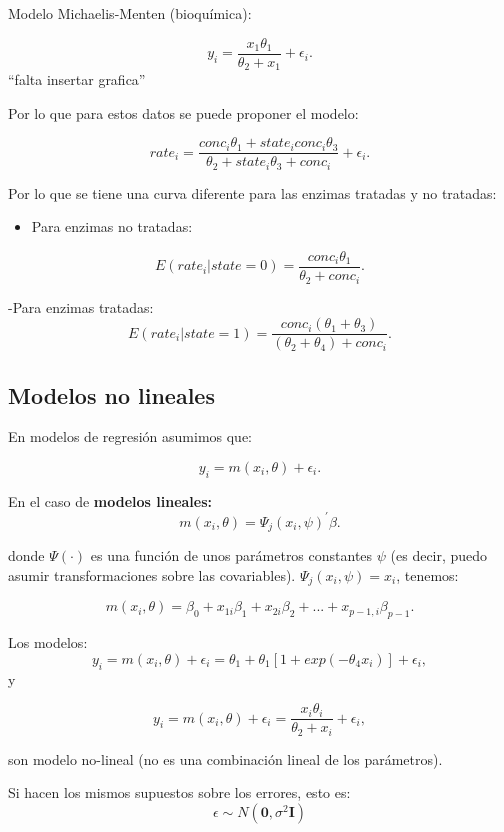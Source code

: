 \documentclass[
]{article}
\providecommand{\tightlist}{%
  \setlength{\itemsep}{0pt}\setlength{\parskip}{0pt}}
\begin{document}
Modelo Michaelis-Menten (bioquímica):

\[
y_{i}=\frac{x_{1}\theta_{1}}{\theta_{2}+x_{1}}+\epsilon_{i}.
\]
``falta insertar grafica''

Por lo que para estos datos se puede proponer el modelo:

\[
rate_{i}=\frac{conc_{i}\theta_{1}+state_{i}conc_{i}\theta_{3}}
{\theta_{2}+state_{i}\theta_{3}+conc_{i}}+\epsilon_{i}.
\]

Por lo que se tiene una curva diferente para las enzimas tratadas y
no tratadas:

\begin{itemize}
\tightlist
\item
  Para enzimas no tratadas:
\end{itemize}

\[
E(rate_{i}|state=0)=\frac{conc_{i}\theta_{1}}{\theta_{2}+conc_{i}}.
\]

-Para enzimas tratadas:
\[
E(rate_{i}|state=1)=\frac{conc_{i}(\theta_{1}+\theta_{3})}{(\theta_{2}+\theta_{4})+conc_{i}}.
\]

\hypertarget{modelos-no-lineales-1}{%
\subsection{Modelos no lineales}\label{modelos-no-lineales-1}}

En modelos de regresión asumimos que:

\[
y_{i}=m(x_{i},\theta)+\epsilon_{i}.
\]

En el caso de \textbf{modelos lineales:}
\[
m(x_{i},\theta)=\Psi_{j}(x_{i},\psi)^{'}\beta.
\]

donde \(\Psi(\cdot)\) es una función de unos parámetros constantes \(\psi\)
(es decir, puedo asumir transformaciones sobre las covariables).
\(\Psi_{j}(x_{i},\psi)=x_{i}\), tenemos:

\[
m(x_{i},\theta)=\beta_{0}+x_{1i}\beta_{1}+x_{2i}\beta_{2}+...+x_{p-1,i}\beta_{p-1}.
\]

Los modelos:
\[
y_{i}=m(x_{i},\theta)+\epsilon_{i}=\theta_{1}+\theta_{1}[1+exp(-\theta_{4}x_{i})]+\epsilon_{i},
\]
y

\[
y_{i}=m(x_{i},\theta)+\epsilon_{i}=\frac{x_{i}\theta_{i}}{\theta_{2}+x_{i}}+\epsilon_{i},
\]

son modelo no-lineal (no es una combinación lineal de los
parámetros).

Si hacen los mismos supuestos sobre los errores, esto es:
\[
\epsilon\sim N(\boldsymbol 0,\sigma^2 \boldsymbol I)
\]
\end{document}
